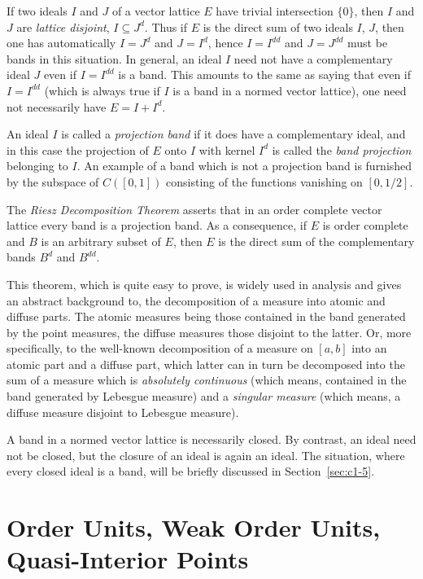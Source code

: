 If two ideals $ I $ and $ J $ of a vector lattice $ E $ have trivial intersection $ \{0\} $, then $ I $ and $ J $ are \emph{lattice disjoint}, \ie $ I \subseteq J^{d} $.
Thus if\/ $ E $ is the direct sum of two ideals $ I $,  $ J $, then one has automatically $ I = J^{d} $ and $ J = I^{d} $, hence $ I = I^{dd} $ and $ J = J^{dd} $ must be bands in this situation.
In general, an ideal $ I $ need not have a complementary ideal $ J $ even if\/ $ I = I^{dd} $ is a band.
This amounts to the same as saying that even if\/ $ I = I^{dd} $ (which is always true if\/ $ I $ is a band in a normed vector lattice), one need not necessarily have $ E = I + I^{d} $.

An ideal $ I $ is called a \emph{projection band} if it does have a complementary ideal, and in this case the projection of\/ $ E $ onto $ I $ with kernel $ I^{d} $ is called the \emph{band projection} belonging to $ I $.
An example of a band which is not a projection band is furnished by the subspace of\/ $ C([0,1]) $ consisting of the functions vanishing on $ [0,1/2] $.

The \emph{Riesz Decomposition Theorem} asserts that in an order complete vector lattice every band is a projection band.
As a consequence, if\/ $ E $ is order complete and $ B $ is an arbitrary subset of\/ $ E $, then $ E $ is the direct sum of the complementary bands $ B^{d} $ and $ B^{dd} $.

This theorem, which is quite easy to prove, is widely used in analysis and gives an abstract background to, \eg the decomposition of a measure into atomic and diffuse parts.
The atomic measures being those contained in the band generated by the point measures, the diffuse measures those disjoint to the latter. 
Or, more specifically, to the well-known decomposition of a measure on $ [a,b] $ into an atomic part and a diffuse part, which latter can in turn be decomposed into the sum of a measure which is \emph{absolutely continuous} (which means, contained in the band generated by Lebesgue measure) and a \emph{singular measure} (which means, a diffuse measure disjoint to Lebesgue measure).

A band in a normed vector lattice is necessarily closed.
By contrast, an ideal need not be closed, but the closure of an ideal is again an ideal.
The situation, where every closed ideal is a band, will be briefly discussed in Section~\ref{sec:c1-5}.
\section{Order Units, Weak Order Units, Quasi-Interior Points}\label{sec:c1-2}%
%
%

